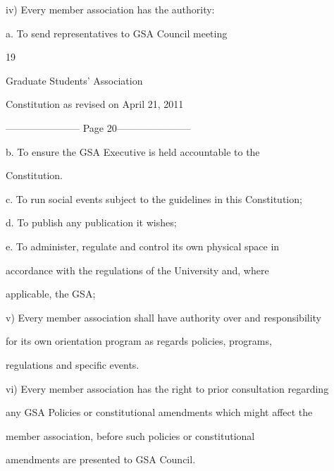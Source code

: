 iv)     Every member association has the authority:  



        a.  To send representatives to GSA Council meeting  



                                                 

                                              19  



                                Graduate Students’ Association  



                           Constitution as revised on April 21, 2011  


----------------------- Page 20-----------------------

        b.  To    ensure    the    GSA     Executive      is   held   accountable       to  the  

            Constitution.  



        c.  To run social events subject to the guidelines in this Constitution;  



        d.  To publish any publication it wishes;  



        e.  To  administer,  regulate  and  control  its  own  physical  space  in  

            accordance  with  the  regulations  of  the  University  and,  where  

            applicable, the GSA;  



v)      Every member association shall have authority over and responsibility  

        for   its   own    orientation   program   as   regards   policies,   programs,  

        regulations and specific events.  



vi)     Every member association has the right to prior consultation regarding  

        any GSA Policies or constitutional amendments which might affect the  

        member        association,      before     such     policies     or    constitutional  

        amendments are presented to GSA Council.  



